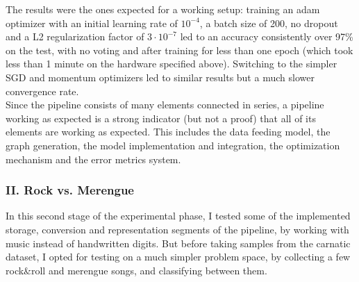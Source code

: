\begin{table}
  \centering
  \caption{The deep NN architecture suggested in \cite{tf-cnn}. There are ReLU layers between convolution and pooling. There is a ReLU and a dropout layer before the logits, in that order.}
  \label{fig:mnist-arch}
\end{table}

The results were the ones expected for a working setup: training an adam optimizer with an initial learning rate of \(10^{-4}\), a batch size of 200, no dropout and a L2 regularization factor of \(3\cdot 10^{-7}\) led to an accuracy consistently over 97\% on the test, with no voting and after training for less than one epoch (which took less than 1 minute on the hardware specified above). Switching to the simpler SGD and momentum optimizers led to similar results but a much slower convergence rate.\\

Since the pipeline consists of many elements connected in series, a pipeline working as expected is a strong indicator (but not a proof) that all of its elements are working as expected. This includes the data feeding model, the graph generation, the model implementation and integration, the optimization mechanism and the error metrics system.\\

\subsubsection{II. Rock vs. Merengue}

In this second stage of the experimental phase, I tested some of the implemented storage, conversion and representation segments of the pipeline, by working with music instead of handwritten digits. But before taking samples from the carnatic dataset, I opted for testing on a much simpler problem space, by collecting a few rock&roll and merengue songs, and classifying between them.\\

